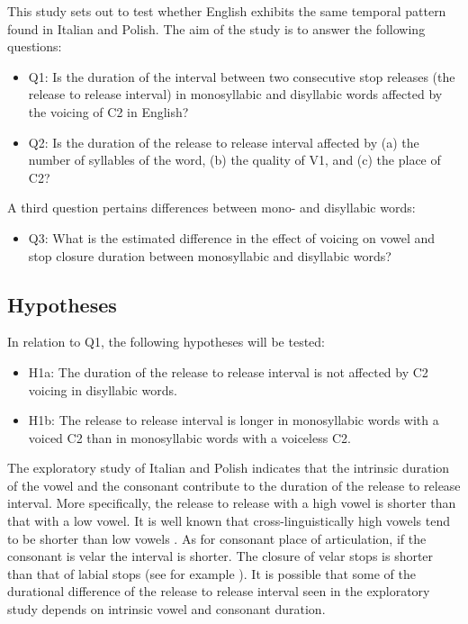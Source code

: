 \documentclass[11pt,]{article}
\providecommand{\tightlist}{%
  \setlength{\itemsep}{0pt}\setlength{\parskip}{0pt}}
\begin{document}
This study sets out to test whether English exhibits the same temporal
pattern found in Italian and Polish. The aim of the study is to answer
the following questions:

\begin{itemize}
\tightlist
\item
  Q1: Is the duration of the interval between two consecutive stop
  releases (the release to release interval) in monosyllabic and
  disyllabic words affected by the voicing of C2 in English?
\item
  Q2: Is the duration of the release to release interval affected by (a)
  the number of syllables of the word, (b) the quality of V1, and (c)
  the place of C2?
\end{itemize}

A third question pertains differences between mono- and disyllabic
words:

\begin{itemize}
\tightlist
\item
  Q3: What is the estimated difference in the effect of voicing on vowel
  and stop closure duration between monosyllabic and disyllabic words?
\end{itemize}

\hypertarget{hypotheses}{%
\subsection{Hypotheses}\label{hypotheses}}

In relation to Q1, the following hypotheses will be tested:

\begin{itemize}
\tightlist
\item
  H1a: The duration of the release to release interval is not affected
  by C2 voicing in disyllabic words.
\item
  H1b: The release to release interval is longer in monosyllabic words
  with a voiced C2 than in monosyllabic words with a voiceless C2.
\end{itemize}

The exploratory study of Italian and Polish indicates that the intrinsic
duration of the vowel and the consonant contribute to the duration of
the release to release interval. More specifically, the release to
release with a high vowel is shorter than that with a low vowel. It is
well known that cross-linguistically high vowels tend to be shorter than
low vowels
\citep{hertrich1997, esposito2002, mortensen2013, toivonen2015, kawahara2017}.
As for consonant place of articulation, if the consonant is velar the
interval is shorter. The closure of velar stops is shorter than that of
labial stops (see for example \citealt{sharf1962}). It is possible that
some of the durational difference of the release to release interval
seen in the exploratory study depends on intrinsic vowel and consonant
duration.
\end{document}

